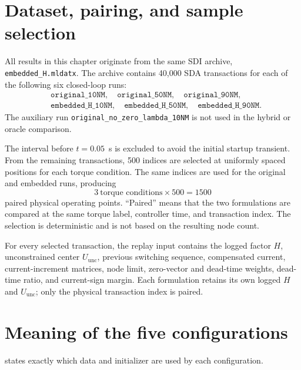 \documentclass[paper=a4,oneside,fontsize=12pt,DIV=14,headings=normal,parskip=half,headsepline,numbers=noendperiod]{scrreprt}
\begin{document}
\section{Dataset, pairing, and sample selection}
All results in this chapter originate from the same SDI archive,
\texttt{embedded\_H.mldatx}.  The archive contains 40,000 SDA transactions for
each of the following six closed-loop runs:
\begin{equation}
\begin{aligned}
 &\texttt{original\_10NM},\quad
  \texttt{original\_50NM},\quad
  \texttt{original\_90NM},\\
 &\texttt{embedded\_H\_10NM},\quad
  \texttt{embedded\_H\_50NM},\quad
  \texttt{embedded\_H\_90NM}.
\end{aligned}
\end{equation}
The auxiliary run \texttt{original\_no\_zero\_lambda\_10NM} is not used in the
hybrid or oracle comparison.

The interval before $t=0.05$~s is excluded to avoid the initial startup
transient.  From the remaining transactions, 500 indices are selected at
uniformly spaced positions for each torque condition.  The same indices are
used for the original and embedded runs, producing
\begin{equation}
 3\ \text{torque conditions}\times500
 =1500
\end{equation}
paired physical operating points.  ``Paired'' means that the two formulations
are compared at the same torque label, controller time, and transaction index.
The selection is deterministic and is not based on the resulting node count.

For every selected transaction, the replay input contains the logged factor
$H$, unconstrained center $U_{\mathrm{unc}}$, previous switching sequence,
compensated current, current-increment matrices, node limit, zero-vector and
dead-time weights, dead-time ratio, and current-sign margin.  Each formulation
retains its own logged $H$ and $U_{\mathrm{unc}}$; only the physical transaction
index is paired.

\section{Meaning of the five configurations}
 states exactly which data and initializer are used by
each configuration.
\end{document}
